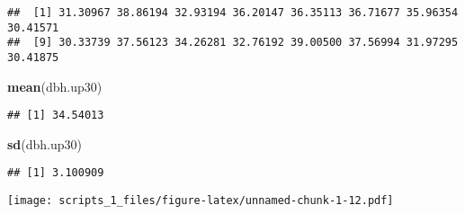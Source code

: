 \documentclass[
]{article}
\newenvironment{Shaded}{\begin{snugshade}}{\end{snugshade}}
\newcommand{\CommentTok}[1]{\textcolor[rgb]{0.56,0.35,0.01}{\textit{#1}}}
\newcommand{\DataTypeTok}[1]{\textcolor[rgb]{0.13,0.29,0.53}{#1}}
\newcommand{\DecValTok}[1]{\textcolor[rgb]{0.00,0.00,0.81}{#1}}
\newcommand{\FloatTok}[1]{\textcolor[rgb]{0.00,0.00,0.81}{#1}}
\newcommand{\KeywordTok}[1]{\textcolor[rgb]{0.13,0.29,0.53}{\textbf{#1}}}
\newcommand{\NormalTok}[1]{#1}
\newcommand{\OperatorTok}[1]{\textcolor[rgb]{0.81,0.36,0.00}{\textbf{#1}}}
\newcommand{\OtherTok}[1]{\textcolor[rgb]{0.56,0.35,0.01}{#1}}
\newcommand{\StringTok}[1]{\textcolor[rgb]{0.31,0.60,0.02}{#1}}
\begin{document}
\begin{verbatim}
##  [1] 31.30967 38.86194 32.93194 36.20147 36.35113 36.71677 35.96354 30.41571
##  [9] 30.33739 37.56123 34.26281 32.76192 39.00500 37.56994 31.97295 30.41875
\end{verbatim}

\begin{Shaded}
\begin{Highlighting}[]
\KeywordTok{mean}\NormalTok{(dbh.up30)}
\end{Highlighting}
\end{Shaded}

\begin{verbatim}
## [1] 34.54013
\end{verbatim}

\begin{Shaded}
\begin{Highlighting}[]
\KeywordTok{sd}\NormalTok{(dbh.up30)}
\end{Highlighting}
\end{Shaded}

\begin{verbatim}
## [1] 3.100909
\end{verbatim}

\begin{Shaded}
\end{Shaded}

\texttt{[image: scripts\_1\_files/figure-latex/unnamed-chunk-1-12.pdf]}
\end{document}
